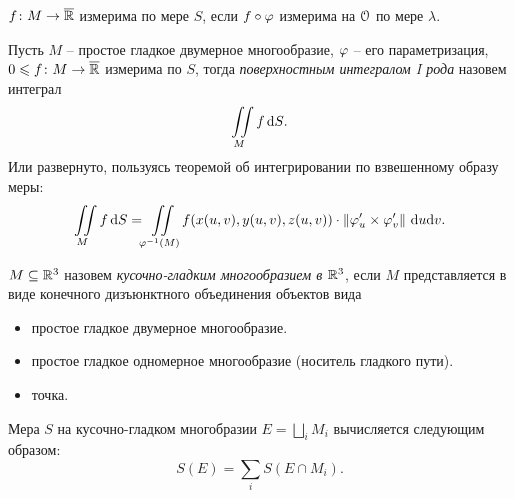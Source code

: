 \begin{definition}
    $f \colon M \to \overline{\mathbb{R}}$ измерима по мере $S$, если $f \circ \varphi$ измерима на $\mathcal{O}$ по мере
    $\lambda$.
\end{definition}

\begin{definition}
    Пусть $M$ -- простое гладкое двумерное многообразие, $\varphi$ -- его параметризация,
    $0 \leqslant f \colon M \to \overline{\mathbb{R}}$ измерима по $S$, тогда
    \textit{поверхностным интегралом I рода} назовем интеграл
\[
    \iint\limits_{M}{f \,\mathrm{d} S}
.\] 
    Или развернуто, пользуясь теоремой об интегрировании по взвешенному образу меры:
\[
    \iint\limits_{M}{f \,\mathrm{d} S} = \iint\limits_{\varphi^{-1}(M)}{f(x(u, v), y(u, v), z(u, v)) \cdot
    \left\lVert\varphi'_u \times \varphi'_v\right\rVert \,\mathrm{d} u \mathrm{d} v}
.\] 
\end{definition}

\begin{definition}
    $M \subseteq \mathbb{R}^3$ назовем \textit{кусочно-гладким многообразием в $\mathbb{R}^3$},
    если $M$ представляется в виде конечного дизъюнктного объединения объектов вида
    \begin{itemize}
        \item простое гладкое двумерное многообразие.
        \item простое гладкое одномерное многообразие (носитель гладкого пути).
        \item точка.
    \end{itemize} 
\end{definition}

\begin{definition}
    Мера $S$ на кусочно-гладком многобразии $E = \bigsqcup_{i}{M_i}$ вычисляется следующим образом:
\[
    S(E) = \sum_{i}{S(E \cap M_i)}
.\] 
\end{definition}



